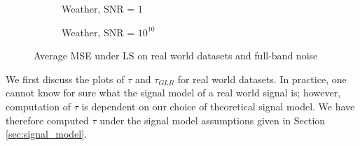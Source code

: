 {\begin{figure}
\begin{subfigure}{0.3\columnwidth}
    \label{weather_MSE_subfiga}
    \end{subfigure}\hfill
    \begin{subfigure}{0.3\columnwidth}
    \caption{Weather, SNR = $1$}%
    \label{weather_MSE_subfigb}%
    \end{subfigure}\hfill%
    \begin{subfigure}{0.3\columnwidth}
    \caption{Weather, SNR = $10^{10}$}%
    \label{weather_MSE_subfigc}%
    \end{subfigure}%
    \caption{Average MSE under LS on real world datasets and full-band noise }
\label{LS_real_MSE_fig}
\end{figure}


We first discuss the plots of $\tau$ and $\tau_{GLR}$ for real world datasets. In practice, one cannot know for sure what the signal model of a real world signal is; however, computation of $\tau$ is dependent on our choice of theoretical signal model. We have therefore computed $\tau$ under the signal model assumptions given in Section \ref{sec:signal_model}.  
}
